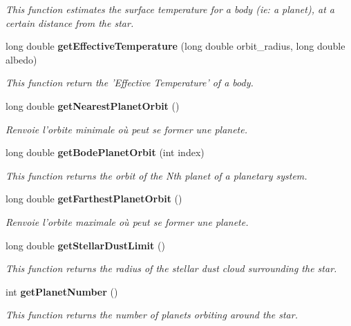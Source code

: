 \begin{CompactItemize}
\begin{CompactList}\small\item\em This function estimates the surface temperature for a body (ie: a planet), at a certain distance from the star. \item\end{CompactList}\item 
long double {\bf get\-Effective\-Temperature} (long double orbit\_\-radius, long double albedo)
\begin{CompactList}\small\item\em This function return the 'Effective Temperature' of a body. \item\end{CompactList}\item 
long double {\bf get\-Nearest\-Planet\-Orbit} ()
\begin{CompactList}\small\item\em Renvoie l'orbite minimale o\`{u} peut se former une planete. \item\end{CompactList}\item 
long double {\bf get\-Bode\-Planet\-Orbit} (int index)
\begin{CompactList}\small\item\em This function returns the orbit of the Nth planet of a planetary system. \item\end{CompactList}\item 
long double {\bf get\-Farthest\-Planet\-Orbit} ()
\begin{CompactList}\small\item\em Renvoie l'orbite maximale o\`{u} peut se former une planete. \item\end{CompactList}\item 
long double {\bf get\-Stellar\-Dust\-Limit} ()
\begin{CompactList}\small\item\em This function returns the radius of the stellar dust cloud surrounding the star. \item\end{CompactList}\item 
int {\bf get\-Planet\-Number} ()\label{class_s_g___star_a15}

\begin{CompactList}\small\item\em This function returns the number of planets orbiting around the star. \item\end{CompactList}\end{CompactItemize}
